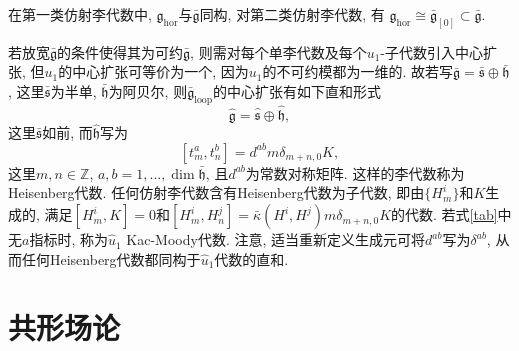 \documentclass{ctexart}%
\theoremstyle{definition}
\theoremstyle{remark}
\begin{document}
在第一类仿射李代数中, $\mathfrak{g}_{\text{hor}}$与$\bar{\mathfrak{g}}$同构, 对第二类仿射李代数, 有 $\mathfrak{g}_{\text{hor}}\cong \bar{\mathfrak{g}}_{[0]}\subset \bar{\mathfrak{g}}$.

若放宽$\bar{\mathfrak{g}}$的条件使得其为可约$\bar{\mathfrak{g}}$, 则需对每个单李代数及每个$u_1$-子代数引入中心扩张, 但$u_1$的中心扩张可等价为一个, 因为$u_1$的不可约模都为一维的. 故若写$\bar{\mathfrak{g}}=\bar{\mathfrak{s}}\oplus \bar{\mathfrak{h}}$, 这里$\bar{\mathfrak{s}}$为半单, $\bar{\mathfrak{h}}$为阿贝尔, 则$\bar{\mathfrak{g}}_{\text{loop}}$的中心扩张有如下直和形式
$$\hat{\mathfrak{g}}=\hat{\mathfrak{s}}\oplus \hat{\mathfrak{h}},$$
这里$\bar{\mathfrak{s}}$如前, 而$\hat{\mathfrak{h}}$写为
\begin{equation}\label{tab}
[t^a_m,t^b_n] = d^{ab} m \delta_{m+n,0}K,
\end{equation}
这里$m,n\in \mathbb{Z}$, $a,b=1,...,\dim \bar{\mathfrak{h}}$, 且$d^{ab}$为常数对称矩阵. 这样的李代数称为Heisenberg代数. 任何仿射李代数含有Heisenberg代数为子代数, 即由$\{H^i_m\}$和$K$生成的, 满足$[H^i_m,K]=0$和$[H^i_m,H^j_n] = \bar{\kappa}(H^i,H^j)m\delta_{m+n,0}K$的代数. 若式\ref{tab}中无$a$指标时,  称为$\hat{u}_1$ Kac\--Moody代数. 注意, 适当重新定义生成元可将$d^{ab}$写为$\delta^{ab}$, 从而任何Heisenberg代数都同构于$\hat{u}_1$代数的直和. 



\section{共形场论}
\end{document}
